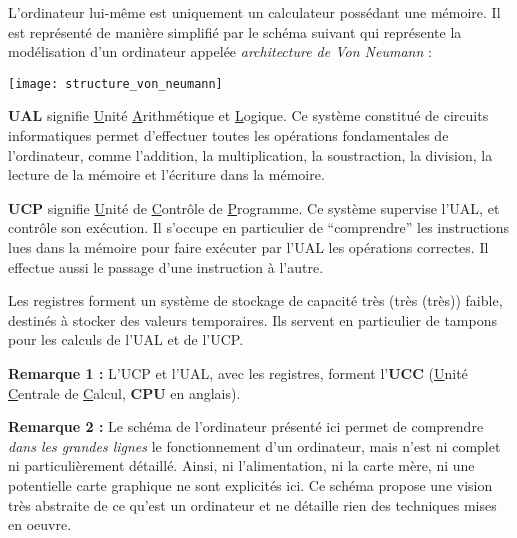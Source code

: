 \documentclass[../../main.tex]{subfiles}
\begin{document}
L'ordinateur lui-même est uniquement un calculateur possédant une mémoire. Il est représenté de manière simplifié par le schéma suivant qui représente la modélisation d'un ordinateur appelée \textit{architecture de Von Neumann} :
\begin{center}
  \texttt{[image: structure\_von\_neumann]}
\end{center}
\textbf{UAL} signifie \underline{U}nité \underline{A}rithmétique et \underline{L}ogique. Ce système constitué de circuits informatiques permet d'effectuer toutes les opérations fondamentales de l'ordinateur, comme l'addition, la multiplication, la soustraction, la division, la lecture de la mémoire et l'écriture dans la mémoire.

\textbf{UCP} signifie \underline{U}nité de \underline{C}ontrôle de \underline{P}rogramme. Ce système supervise l'UAL, et contrôle son exécution. Il s'occupe en particulier de ``comprendre'' les instructions lues dans la mémoire pour faire exécuter par l'UAL les opérations correctes. Il effectue aussi le passage d'une instruction à l'autre.

Les registres forment un système de stockage de capacité très (très (très)) faible, destinés à stocker des valeurs temporaires. Ils servent en particulier de tampons pour les calculs de l'UAL et de l'UCP.

\textbf{Remarque 1 :} L'UCP et l'UAL, avec les registres, forment l'\textbf{UCC} (\underline{U}nité \underline{C}entrale de \underline{C}alcul, \textbf{CPU} en anglais).

\textbf{Remarque 2 :} Le schéma de l'ordinateur présenté ici permet de comprendre \textit{dans les grandes lignes} le fonctionnement d'un ordinateur, mais n'est ni complet ni particulièrement détaillé. Ainsi, ni l'alimentation, ni la carte mère, ni une potentielle carte graphique ne sont explicités ici. Ce schéma propose une vision très abstraite de ce qu'est un ordinateur et ne détaille rien des techniques mises en oeuvre.
\end{document}

